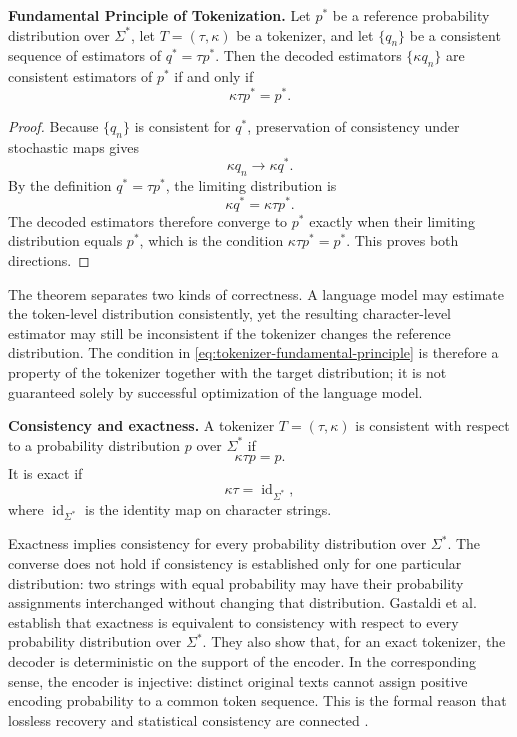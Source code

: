 \begin{theorem}
\textbf{Fundamental Principle of Tokenization.}
Let \(p^*\) be a reference probability distribution over \(\Sigma^*\), let \(T=(\tau,\kappa)\) be a tokenizer, and let \(\{q_n\}\) be a consistent sequence of estimators of \(q^*=\tau p^*\). Then the decoded estimators \(\{\kappa q_n\}\) are consistent estimators of \(p^*\) if and only if
\begin{equation}
    \boxed{\kappa\tau p^*=p^*.}
    \label{eq:tokenizer-fundamental-principle}
\end{equation}
\label{thm:tokenizer-fundamental-principle}
\end{theorem}

\begin{proof}
Because \(\{q_n\}\) is consistent for \(q^*\), preservation of consistency under stochastic maps gives
\[
    \kappa q_n\longrightarrow\kappa q^*.
\]
By the definition \(q^*=\tau p^*\), the limiting distribution is
\[
    \kappa q^*=\kappa\tau p^*.
\]
The decoded estimators therefore converge to \(p^*\) exactly when their limiting distribution equals \(p^*\), which is the condition \(\kappa\tau p^*=p^*\). This proves both directions.
\end{proof}

The theorem separates two kinds of correctness. A language model may estimate the token-level distribution consistently, yet the resulting character-level estimator may still be inconsistent if the tokenizer changes the reference distribution. The condition in \cref{eq:tokenizer-fundamental-principle} is therefore a property of the tokenizer together with the target distribution; it is not guaranteed solely by successful optimization of the language model.

\begin{definition}
\textbf{Consistency and exactness.}
A tokenizer \(T=(\tau,\kappa)\) is consistent with respect to a probability distribution \(p\) over \(\Sigma^*\) if
\[
    \kappa\tau p=p.
\]
It is exact if
\begin{equation}
    \kappa\tau=\operatorname{id}_{\Sigma^*},
    \label{eq:tokenizer-exactness}
\end{equation}
where \(\operatorname{id}_{\Sigma^*}\) is the identity map on character strings.
\label{def:tokenizer-exactness}
\end{definition}

Exactness implies consistency for every probability distribution over \(\Sigma^*\). The converse does not hold if consistency is established only for one particular distribution: two strings with equal probability may have their probability assignments interchanged without changing that distribution. Gastaldi et al. establish that exactness is equivalent to consistency with respect to every probability distribution over \(\Sigma^*\). They also show that, for an exact tokenizer, the decoder is deterministic on the support of the encoder. In the corresponding sense, the encoder is injective: distinct original texts cannot assign positive encoding probability to a common token sequence. This is the formal reason that lossless recovery and statistical consistency are connected \parencite{gastaldi2025foundations}.

